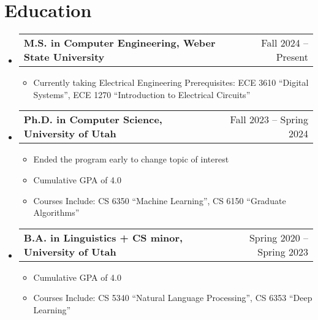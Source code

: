 \documentclass[letterpaper,11pt]{article}
\makeatletter
\newcommand{\resumeItem}[1]{
  \item{
    {#1 \vspace{-4pt}}
  }
}
\newcommand{\resumeSubheading}[4]{
  \vspace{-5pt}\item
    \begin{tabular*}{0.97\textwidth}[t]{l@{\extracolsep{\fill}}r}
      \textbf{#1} & #2 \\
    \end{tabular*}\vspace{-10pt}
}
\newcommand{\resumeSubHeadingListStart}{\vspace{1pt}\begin{itemize}[leftmargin=0.15in, label={}]}
\newcommand{\resumeSubHeadingListEnd}{\end{itemize}}
\newcommand{\resumeItemListStart}{\begin{itemize}}
\newcommand{\resumeItemListEnd}{\end{itemize}\vspace{-5pt}}
\makeatother
\begin{document}
\section{Education}
\resumeSubHeadingListStart
    \resumeSubheading
        {M.S. in Computer Engineering, Weber State University}{Fall 2024 -- Present}
        {}{}
        \resumeItemListStart\small
        \resumeItem{Currently taking Electrical Engineering Prerequisites: ECE 3610 ``Digital Systems'', ECE 1270 ``Introduction to Electrical Circuits''}
        \resumeItemListEnd
    \resumeSubheading
        {Ph.D. in Computer Science, University of Utah}{Fall 2023 -- Spring 2024}
        {}{}
        \resumeItemListStart\small
            \resumeItem{Ended the program early to change topic of interest}
            \resumeItem{Cumulative GPA of 4.0}
            \resumeItem{Courses Include: CS 6350 ``Machine Learning'', CS 6150 ``Graduate Algorithms''}
        \resumeItemListEnd
    \resumeSubheading
        {B.A. in Linguistics + CS minor, University of Utah}{Spring 2020 -- Spring 2023}
        {}{}
        \resumeItemListStart\small
            \resumeItem{Cumulative GPA of 4.0}
            \resumeItem{Courses Include: CS 5340 ``Natural Language Processing'', CS 6353 ``Deep Learning''}
        \resumeItemListEnd
\resumeSubHeadingListEnd












\end{document}
